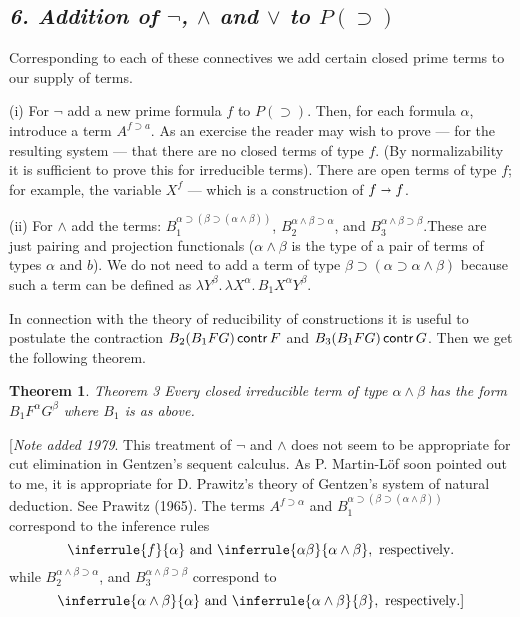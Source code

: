 \documentclass[12pt]{article}
\def\imp{\shortrightarrow}
\def\l{\lambda}
\def\limp{\supset}
\def\PI{P(\limp)}
\def\a{\alpha}
\def\b{\beta}
\newtheorem{theorem}{Theorem}
\begin{document}
\def\fimpa{f \limp a}
\def\contr{\mathop{\sf contr}}

\subsection*{\it 6. Addition of $\lnot$, $\land$ and $\lor$ to $\PI$}

Corresponding to each of these connectives we add certain closed prime terms to our supply of terms.

\medskip
\noindent
(i) For $\lnot$ add a new prime formula $f$ to $\PI$. Then, for each formula $\a$, introduce a term
$A^{\fimpa}$. As an exercise the reader may wish to prove --- for the resulting system ---
that there are no closed terms of type $f$. (By normalizability it is sufficient to prove this for irreducible terms). 
There are open terms of type $f$; for example, the variable $X^f$ — which is a construction of $f \imp f$.

\medskip
\noindent
(ii) For $\land$ add the terms: $B_1^{\a \limp (\b \limp (\a \land \b))}$, $B_2^{\a \land \b \limp \a}$, and $B_3^{\a \land \b \limp \b}$.These are just pairing and projection functionals ($\a \land \b$ is the type of a pair of
terms of types $\a$ and $b$). We do not need to add a term of type $\b \limp (\a \limp \a \land \b)$
because such a term can be defined as $\l Y^\b . \, \l X ^\a . \, B_1 X^\a Y^\b$.

In connection with the theory of reducibility of constructions it is useful to postulate the contraction
$B_2(B_1 FG) \contr F $ and $B_3(B_1 FG) \contr G$.
Then we get the following theorem.

\begin{theorem}
Theorem 3 Every closed irreducible term of type $\a \land \b$ has the form $B_1 F^\a G^\b $ where $B_1$ is as above.
\end{theorem}
[{\it Note added 1979}. This treatment of $\lnot$ and $\land$ does not seem to be appropriate for cut elimination in Gentzen's sequent calculus. 
As P. Martin-Löf soon pointed out to me, it is appropriate for D. Prawitz's theory of Gentzen's system of natural deduction.
See Prawitz (1965). The terms $A^{f \limp \a}$ and $B_1^{\a \limp (\b \limp (\a \land \b))}$ correspond
to the inference rules
$$
\inferrule{f}{\a} \text{ and } \inferrule{\a \b}{\a \land \b}, \text{ respectively}.
$$
while $B_2^{\a \land \b \limp \a}$, and $B_3^{\a \land \b \limp \b}$ correspond to
$$
\inferrule{\a \land \b}{\a} \text{ and } \inferrule{\a \land \b}{\b}, \text{ respectively}. ]
$$
\end{document}
